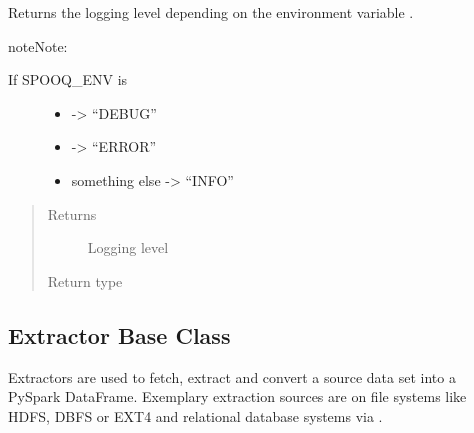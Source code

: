 \documentclass[a4paper,10pt, twoside,english]{sphinxmanual}
\begin{document}
\begin{fulllineitems}
\label{\detokenize{base_classes/spooq2_logger:spooq2.spooq2_logger.get_logging_level}}
Returns the logging level depending on the environment variable .

\begin{sphinxadmonition}{note}{Note:}\begin{description}
\item[{If SPOOQ\_ENV is}] \leavevmode\begin{itemize}
\item {} 
        -\textgreater{} “DEBUG”

\item {} 
       -\textgreater{} “ERROR”

\item {} 
something else -\textgreater{} “INFO”

\end{itemize}

\end{description}
\end{sphinxadmonition}
\begin{quote}\begin{description}
\item[{Returns}] \leavevmode
Logging level

\item[{Return type}] \leavevmode
{}

\end{description}\end{quote}

\end{fulllineitems}



\subsection{Extractor Base Class}
\label{\detokenize{base_classes/extractor:module-spooq2.extractor.extractor}}\label{\detokenize{base_classes/extractor:extractor-base-class}}\label{\detokenize{base_classes/extractor::doc}}
Extractors are used to fetch, extract and convert a source data set into a PySpark DataFrame.
Exemplary extraction sources are  on file systems like HDFS, DBFS or EXT4
and relational database systems via .
\end{document}
